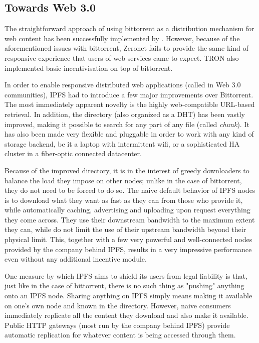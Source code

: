 \subsection{Towards Web 3.0}

The straightforward approach of using bittorrent as a distribution mechanism for web content has been successfully implemented by  \cite{zeronet}. However, because of the aforementioned issues with bittorrent, Zeronet fails to provide the same kind of responsive experience that users of web services came to expect. TRON \cite{tron} also implemented basic incentivisation on top of bittorrent.

In order to enable responsive distributed web applications (called  in Web 3.0 communities), IPFS \cite{ipfs2014} had to introduce a few major improvements over Bittorrent. The most immediately apparent novelty is the highly web-compatible URL-based retrieval. In addition, the directory (also organized as a DHT) has been vastly improved, making it possible to search for any part of any file (called \emph{chunk}). It has also been made very flexible and pluggable in order to work with any kind of storage backend, be it a laptop with intermittent wifi, or a sophisticated HA cluster in a fiber-optic connected datacenter.



Because of the improved directory, it is in the interest of greedy downloaders to balance the load they impose on other nodes; unlike in the case of bittorrent, they do not need to be forced to do so. The naive default behavior of IPFS nodes is to download what they want as fast as  they can from those who provide it, while automatically caching, advertising and uploading upon request everything they come across. They use their downstream bandwidth to the maximum extent they can, while do not limit the use of their upstream bandwidth beyond their physical limit. This, together with a few very powerful and well-connected nodes provided by the company behind IPFS, results in a very impressive performance even without any additional incentive module.


One measure by which IPFS aims to shield its users from legal liability is that, just like in the case of bittorrent, there is no such thing as "pushing" anything onto an IPFS node. Sharing anything on IPFS simply means making it available on one's own node and known in the directory. However, naive consumers immediately replicate all the content they download and also make it available. Public HTTP gateways (most run by the company behind IPFS) provide automatic replication for whatever content is being accessed through them.

